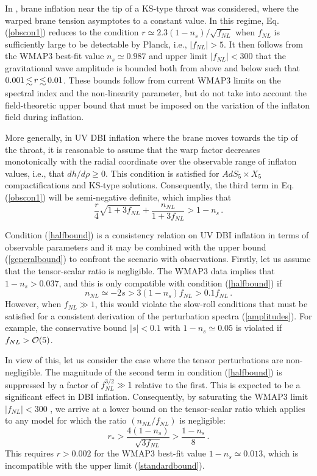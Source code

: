 In \cite{lidser2}, brane inflation near the tip of a KS-type 
throat was considered, where the warped brane tension asymptotes to a 
constant value. In this regime, Eq. (\ref{obscon1}) reduces to 
the condition $r \simeq 2.3 (1-n_s)/\sqrt{f_{NL}}$ when $f_{NL}$ is 
sufficiently large to be detectable by Planck, 
i.e., $|f_{NL}| > 5$. It then follows from the  
WMAP3 best-fit value $n_s \simeq 0.987$ and upper limit 
$|f_{NL}| < 300$ \cite{crim} that the gravitational wave amplitude 
is bounded both from above and below such that $0.001 \, \lsim \, r 
\, \lsim \, 0.01$. These bounds follow from 
current WMAP3 limits on the spectral index and the 
non-linearity parameter, but do not take into account the 
field-theoretic upper bound that must be imposed 
on the variation of the inflaton field during inflation. 

More generally, in UV DBI inflation where the brane moves towards the 
tip of the throat, it is reasonable to assume 
that the warp factor decreases monotonically 
with the radial coordinate over the observable range of inflaton values, 
i.e., that $dh/d \rho \ge 0$. This condition is satisfied for  
$AdS_5 \times X_5$ compactifications and KS-type solutions. 
Consequently, the third term in 
Eq. (\ref{obscon1}) will be semi-negative definite, 
which implies that 
\begin{equation}
\label{halfbound}
\frac{r}{4} \sqrt{1+3f_{NL}} + \frac{n_{NL}}{1+3f_{NL}} 
> 1-n_s \,.
\end{equation}

Condition (\ref{halfbound}) is a consistency relation on UV DBI 
inflation in terms of observable parameters and it 
may be combined with the upper bound 
(\ref{generalbound}) to confront the scenario with observations.
Firstly, let us assume that the tensor-scalar ratio is negligible. 
The WMAP3 data implies that $1-n_s > 0.037$, and this is only 
compatible with condition (\ref{halfbound}) if 
\begin{equation}
\label{anotherbound}
n_{NL} \simeq -2s > 3 (1-n_s ) f_{NL} > 0.1 f_{NL} \,.
\end{equation}
However, when $f_{NL} \gg 1$, this would violate the slow-roll conditions
that must be satisfied for a consistent 
derivation of the perturbation spectra 
(\ref{amplitudes}). For example, the conservative 
bound $|s| < 0.1$ with $1-n_s \simeq 0.05$ is violated if  
$f_{NL} > {\cal{O}} (5)$. 

In view of this, let us consider the case where the tensor 
perturbations are non-negligible. 
The magnitude of the second term in condition (\ref{halfbound}) 
is suppressed by a factor of $f_{NL}^{3/2} \gg 1$ 
relative to the first. This is expected to 
be a significant effect in DBI inflation. Consequently, 
by saturating the WMAP3 limit $|f_{NL}| < 300$ \cite{crim}, we arrive at 
a lower bound on the tensor-scalar ratio which applies   
to any model for which the ratio $(n_{NL}/f_{NL})$ is 
negligible:
\begin{equation}
\label{lowerbound}
r_* >  \frac{4(1-n_s)}{\sqrt{3f_{NL}}} > \frac{1-n_s}{8} \,.
\end{equation}
This requires $r > 0.002$ for the WMAP3 best-fit value 
$1-n_s \simeq 0.013$, which is incompatible with the upper limit 
(\ref{standardbound}). 

